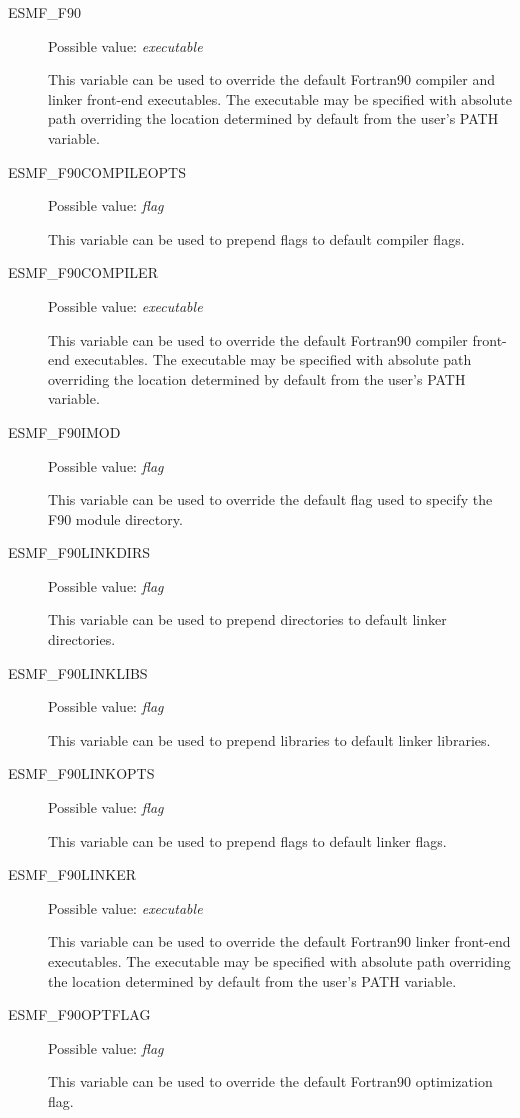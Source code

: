 \begin{description}
\item[ESMF\_F90]
Possible value: {\em executable}

This variable can be used to override the default Fortran90 compiler and linker
front-end executables. The executable may be specified with absolute path
overriding the location determined by default from the user's PATH variable.

\item[ESMF\_F90COMPILEOPTS]
Possible value: {\em flag}

This variable can be used to prepend flags to default compiler flags.

\item[ESMF\_F90COMPILER]
Possible value: {\em executable}

This variable can be used to override the default Fortran90 compiler
front-end executables. The executable may be specified with absolute path
overriding the location determined by default from the user's PATH variable.

\item[ESMF\_F90IMOD]
Possible value: {\em flag}

This variable can be used to override the default flag used to specify the F90
module directory.

\item[ESMF\_F90LINKDIRS]
Possible value: {\em flag}

This variable can be used to prepend directories to default linker directories.

\item[ESMF\_F90LINKLIBS]
Possible value: {\em flag}

This variable can be used to prepend libraries to default linker libraries.

\item[ESMF\_F90LINKOPTS]
Possible value: {\em flag}

This variable can be used to prepend flags to default linker flags.

\item[ESMF\_F90LINKER]
Possible value: {\em executable}

This variable can be used to override the default Fortran90 linker
front-end executables. The executable may be specified with absolute path
overriding the location determined by default from the user's PATH variable.

\item[ESMF\_F90OPTFLAG]
Possible value: {\em flag}

This variable can be used to override the default  Fortran90 optimization flag.


\end{description}
